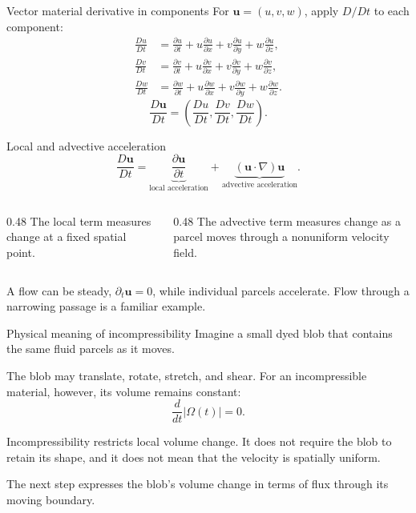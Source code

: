 \documentclass[aspectratio=169,11pt]{beamer}
\newcommand{\uvec}{\bm{u}}
\begin{document}
\begin{frame}{Vector material derivative in components}
For $\uvec=(u,v,w)$, apply $D/Dt$ to each component:
\begin{align*}
  \frac{Du}{Dt}
  &=\frac{\partial u}{\partial t}
    +u\frac{\partial u}{\partial x}
    +v\frac{\partial u}{\partial y}
    +w\frac{\partial u}{\partial z},\\[4pt]
  \frac{Dv}{Dt}
  &=\frac{\partial v}{\partial t}
    +u\frac{\partial v}{\partial x}
    +v\frac{\partial v}{\partial y}
    +w\frac{\partial v}{\partial z},\\[4pt]
  \frac{Dw}{Dt}
  &=\frac{\partial w}{\partial t}
    +u\frac{\partial w}{\partial x}
    +v\frac{\partial w}{\partial y}
    +w\frac{\partial w}{\partial z}.
\end{align*}
\[
  \frac{D\uvec}{Dt}=
  \left(\frac{Du}{Dt},\frac{Dv}{Dt},\frac{Dw}{Dt}\right).
\]
\end{frame}

\begin{frame}{Local and advective acceleration}
\[
  \frac{D\uvec}{Dt}
  =\underbrace{\frac{\partial\uvec}{\partial t}}_{\text{local acceleration}}
  +\underbrace{(\uvec\cdot\nabla)\uvec}_{\text{advective acceleration}}.
\]
\begin{columns}[T,onlytextwidth]
\begin{column}{0.48\textwidth}
The local term measures change at a fixed spatial point.
\end{column}
\begin{column}{0.48\textwidth}
The advective term measures change as a parcel moves through a nonuniform velocity field.
\end{column}
\end{columns}
\begin{punchbox}
\small A flow can be steady, $\partial_t\uvec=0$, while individual parcels accelerate. Flow through a narrowing passage is a familiar example.
\end{punchbox}
\end{frame}

\begin{frame}{Physical meaning of incompressibility}
Imagine a small dyed blob that contains the same fluid parcels as it moves.

\medskip
The blob may translate, rotate, stretch, and shear. For an incompressible material, however, its volume remains constant:
\[
  \boxed{\frac{d}{dt}|\Omega(t)|=0}.
\]
\begin{punchbox}
\small Incompressibility restricts local volume change. It does not require the blob to retain its shape, and it does not mean that the velocity is spatially uniform.
\end{punchbox}
The next step expresses the blob's volume change in terms of flux through its moving boundary.
\end{frame}
\end{document}
